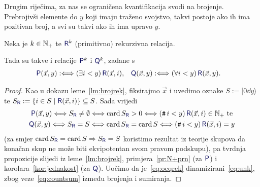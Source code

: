 Drugim riječima, za nas se ograničena kvantifikacija svodi na brojenje. Prebrojivši elemente do $y$ koji imaju traženo svojstvo, takvi postoje ako ih ima pozitivan broj, a svi su takvi ako ih ima upravo $y$.

\begin{propozicija}[{name=[ograničena kvantifikacija čuva (primitivnu) rekurzivnost]}]\label{prop:okvantrek}
Neka je $k\in{\mathbb N}_+$ te $\f R^k$ (primitivno) rekurzivna relacija.
	
	Tada su takve i relacije $\f P^k$ i $\f Q^k$, zadane s
\begin{align}
	\f P(\vec x,y)&:\Longleftrightarrow(\exists i<y)\,\f R(\vec x,i)\text,&
        \f Q(\vec x,y)&:\Longleftrightarrow(\forall i<y)\,\f R(\vec x,y)\text.
\end{align}
\end{propozicija}
\begin{proof}
    Kao u dokazu leme~\ref{lm:brojrek}, fiksirajmo $\vec x$ i uvedimo oznake $S:=[0\dd y\rangle$\newline te $S_{\f R}:=\{i\in S\mid\f R(\vec x,i)\}\subseteq S$. Sada vrijedi
\begin{gather}
\label{eq:oeqrek}\quad\f P(\vec x,y)\Longleftrightarrow S_{\f R}\ne\emptyset\Longleftrightarrow\card S_{\f R}>0\Longleftrightarrow(\num i<y)\,\f R(\vec x,i)\in\N_+\text{ te\quad}\\
\f Q(\vec x,y)\Longleftrightarrow S_{\f R}=S\Longleftrightarrow\card S_{\f R}=\card S\Longleftrightarrow(\num i<y)\,\f R(\vec x,i)\eq y
\end{gather}
	(za smjer $\card S_{\f R}=\card S\Rightarrow S_{\f R}=S$ koristimo rezultat iz teorije skupova da konačan skup ne može biti ekvipotentan svom pravom podskupu), pa tvrdnja propozicije slijedi iz leme~\ref{lm:brojrek}, primjera~\ref{pr:N+prn} (za $\f P$) i korolara~\ref{kor:jednakost} (za $\f Q$). Uočimo da je~\eqref{eq:oeqrek} dinamizirani~\eqref{eq:unk}, zbog veze~\eqref{eq:countsum} između brojenja i sumiranja.
\end{proof}

%

